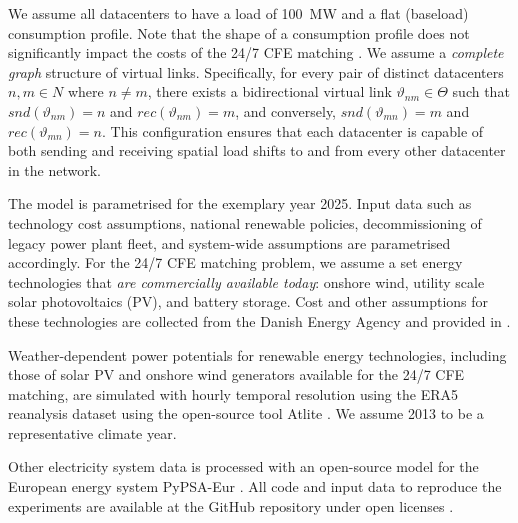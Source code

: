We assume all datacenters to have a load of 100~MW and a flat (baseload) consumption profile. Note that the shape of a consumption profile does not significantly impact the costs of the 24/7 CFE matching \cite{riepin-zenodo-systemlevel247}. We assume a \textit{complete graph} structure of virtual links. Specifically, for every pair of distinct datacenters \(n, m \in N\) where \(n \neq m\), there exists a bidirectional virtual link \(\vartheta_{nm} \in \Theta\) such that \(snd(\vartheta_{nm}) = n\) and \(rec(\vartheta_{nm}) = m\), and conversely, \(snd(\vartheta_{mn}) = m\) and \(rec(\vartheta_{mn}) = n\). This configuration ensures that each datacenter is capable of both sending and receiving spatial load shifts to and from every other datacenter in the network.

The model is parametrised for the exemplary year 2025. Input data such as technology cost assumptions, national renewable policies, decommissioning of legacy power plant fleet, and system-wide assumptions are parametrised accordingly. For the 24/7 CFE matching problem, we assume a set energy technologies that \textit{are commercially available today}: onshore wind, utility scale solar photovoltaics (\gls{PV}), and battery storage. Cost and other assumptions for these technologies are collected from the Danish Energy Agency \cite{DEA-technologydata} and provided in .

Weather-dependent power potentials for renewable energy technologies, including those of solar PV and onshore wind generators available for the 24/7 CFE matching, are simulated with hourly temporal resolution using the ERA5 reanalysis dataset \cite{hersbachERA5GlobalReanalysis2020} using the open-source tool Atlite \cite{atlite-github}. We assume 2013 to be a representative climate year.

Other electricity system data is processed with an open-source model for the European energy system PyPSA-Eur \cite{PyPSAEur-docs}. All code and input data to reproduce the experiments are available at the GitHub repository under open licenses \cite{github-spacetime}.


